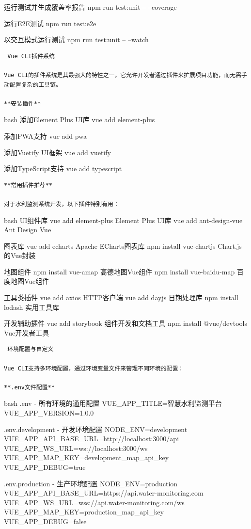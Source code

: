 {{ 运行测试并生成覆盖率报告 npm run test:unit -- --coverage

 运行E2E测试 npm run test:e2e

 以交互模式运行测试 npm run test:unit -- --watch

\begin{lstlisting}
 Vue CLI插件系统

Vue CLI的插件系统是其最强大的特性之一，它允许开发者通过插件来扩展项目功能，而无需手动配置复杂的工具链。

**安装插件**
\end{lstlisting}

bash  添加Element Plus UI库 vue add element-plus

 添加PWA支持 vue add pwa

 添加Vuetify UI框架 vue add vuetify

 添加TypeScript支持 vue add typescript

\begin{lstlisting}
**常用插件推荐**

对于水利监测系统开发，以下插件特别有用：
\end{lstlisting}

bash  UI组件库 vue add element-plus  Element Plus UI库 vue add ant-design-vue  Ant Design Vue

 图表库 vue add echarts  Apache ECharts图表库 npm install vue-chartjs  Chart.js的Vue封装

 地图组件 npm install vue-amap  高德地图Vue组件 npm install vue-baidu-map  百度地图Vue组件

 工具类插件 vue add axios  HTTP客户端 vue add dayjs  日期处理库 npm install lodash  实用工具库

 开发辅助插件 vue add storybook  组件开发和文档工具 npm install @vue/devtools  Vue开发者工具

\begin{lstlisting}
 环境配置与自定义

Vue CLI支持多环境配置，通过环境变量文件来管理不同环境的配置：

**.env文件配置**
\end{lstlisting}

bash  .env - 所有环境的通用配置 VUE\_APP\_TITLE=智慧水利监测平台 VUE\_APP\_VERSION=1.0.0

 .env.development - 开发环境配置 NODE\_ENV=development VUE\_APP\_API\_BASE\_URL=http://localhost:3000/api VUE\_APP\_WS\_URL=ws://localhost:3000/ws VUE\_APP\_MAP\_KEY=development\_map\_api\_key VUE\_APP\_DEBUG=true

 .env.production - 生产环境配置 NODE\_ENV=production VUE\_APP\_API\_BASE\_URL=https://api.water-monitoring.com VUE\_APP\_WS\_URL=wss://api.water-monitoring.com/ws VUE\_APP\_MAP\_KEY=production\_map\_api\_key VUE\_APP\_DEBUG=false

}}

